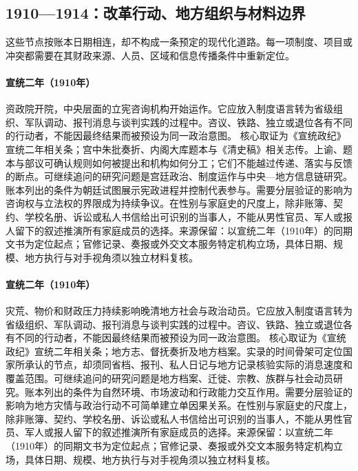 \subsection{1910—1914：改革行动、地方组织与材料边界}
这些节点按账本日期相连，却不构成一条预定的现代化道路。每一项制度、项目或冲突都需要在其财政来源、人员、区域和信息传播条件中重新定位。
\hypertarget{public:EQ-1910-ZIZHENG-YUAN}{}\paragraph{宣统二年（1910年）}资政院开院，中央层面的立宪咨询机构开始运作。它应放入制度语言转为省级组织、军队调动、报刊消息与谈判实践的过程中。咨议、铁路、独立或退位各有不同的行动者，不能因最终结果而被预设为同一政治意图。 核心取证为《宣统政纪》宣统二年相关条；宫中朱批奏折、内阁大库题本与《清史稿》相关志传。上谕、题本与部议可确认规则如何被提出和机构如何分工；它们不能越过传递、落实与反馈的断点。可继续追问的研究问题是宫廷政治、制度运作与中央—地方信息链研究。账本列出的条件为朝廷试图展示宪政进程并控制代表参与。需要分层验证的影响为咨询权与立法权的界限成为持续争议。在性别与家庭史的尺度上，除非账簿、契约、学校名册、诉讼或私人书信给出可识别的当事人，不能从男性官员、军人或报人留下的叙述推演所有家庭成员的选择。来源保留：以宣统二年（1910年）的同期文书为定位起点；官修记录、奏报或外交文本服务特定机构立场，具体日期、规模、地方执行与对手视角须以独立材料复核。
\hypertarget{public:EQ-1910-FAMINE-AND-UNREST}{}\paragraph{宣统二年（1910年）}灾荒、物价和财政压力持续影响晚清地方社会与政治动员。它应放入制度语言转为省级组织、军队调动、报刊消息与谈判实践的过程中。咨议、铁路、独立或退位各有不同的行动者，不能因最终结果而被预设为同一政治意图。 核心取证为《宣统政纪》宣统二年相关条；地方志、督抚奏折及地方档案。实录的时间骨架可定位国家所承认的节点，却须同省档、报刊、私人日记与地方记录核验实际的消息速度和覆盖范围。可继续追问的研究问题是地方档案、迁徙、宗教、族群与社会动员研究。账本列出的条件为自然环境、市场波动和行政能力交互作用。需要分层验证的影响为地方灾情与政治行动不可简单建立单因果关系。在性别与家庭史的尺度上，除非账簿、契约、学校名册、诉讼或私人书信给出可识别的当事人，不能从男性官员、军人或报人留下的叙述推演所有家庭成员的选择。来源保留：以宣统二年（1910年）的同期文书为定位起点；官修记录、奏报或外交文本服务特定机构立场，具体日期、规模、地方执行与对手视角须以独立材料复核。
